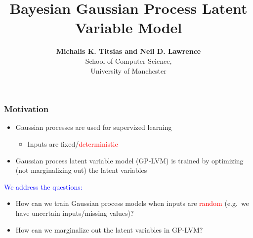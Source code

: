 \documentclass{beamer}
\title{Bayesian Gaussian Process Latent Variable Model}
\author{{\bf Michalis K. Titsias and  Neil D. Lawrence}\\ 
School of Computer Science, \\
University of Manchester}
\date{}
\begin{document}
\frame{\titlepage}





\frame
{
\frametitle{Motivation}





\begin{itemize}

\item Gaussian processes are used for supervized learning
 
\begin{itemize} 

\item Inputs are fixed/\textcolor{red}{deterministic} 
       
\end{itemize}

\item Gaussian process latent variable model (GP-LVM) is trained  
      by optimizing (not marginalizing out) the latent variables 



\end{itemize}

\textcolor{blue}{We address the questions:}

\begin{itemize}

\item How can we train Gaussian process models when inputs are \textcolor{red}{random}
  (e.g.\ we have uncertain inputs/missing values)? 

\item How can we marginalize out the latent variables in GP-LVM?
      



\end{itemize}



}
\end{document}
